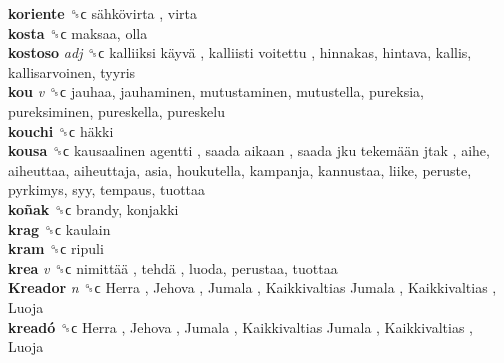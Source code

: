 \textbf{koriente} ␝ϲ   sähkövirta , virta  \\
\textbf{kosta} ␝ϲ  maksaa, olla  \\
\textbf{kostoso} \emph{adj}  ␝ϲ   kalliiksi käyvä ,  kalliisti voitettu , hinnakas, hintava, kallis, kallisarvoinen, tyyris  \\
\textbf{kou} \emph{v}  ␝ϲ  jauhaa, jauhaminen, mutustaminen, mutustella, pureksia, pureksiminen, pureskella, pureskelu  \\
\textbf{kouchi} ␝ϲ   häkki   \\
\textbf{kousa} ␝ϲ   kausaalinen agentti ,  saada aikaan ,  saada jku tekemään jtak , aihe, aiheuttaa, aiheuttaja, asia, houkutella, kampanja, kannustaa, liike, peruste, pyrkimys, syy, tempaus, tuottaa  \\
\textbf{koñak} ␝ϲ  brandy, konjakki  \\
\textbf{krag} ␝ϲ  kaulain  \\
\textbf{kram} ␝ϲ  ripuli  \\
\textbf{krea} \emph{v}  ␝ϲ   nimittää ,  tehdä , luoda, perustaa, tuottaa  \\
\textbf{Kreador} \emph{n}  ␝ϲ   Herra ,  Jehova ,  Jumala ,  Kaikkivaltias Jumala ,  Kaikkivaltias ,  Luoja   \\
\textbf{kreadó} ␝ϲ   Herra ,  Jehova ,  Jumala ,  Kaikkivaltias Jumala ,  Kaikkivaltias ,  Luoja   \\
